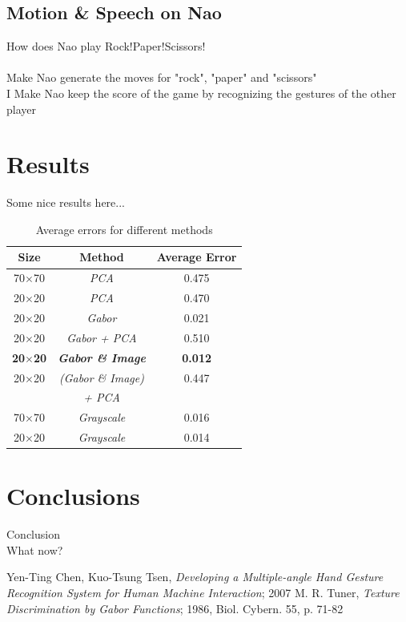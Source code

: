 \documentclass[a4paper, 11pt, twocolumn]{article}
\begin{document}
        \subsection{Motion \& Speech on Nao}
		\label{sec:Meth_naoPlay}
        How does Nao play Rock!Paper!Scissors!\\\\
        Make Nao generate the moves for "rock", "paper" and "scissors"\\
        I Make Nao keep the score of the game by recognizing the gestures of the
        other player
    \section{Results}
	\label{sec:results}
    	Some nice results here...\\
		\begin{table}[!hbtp]
		\begin{tabular}{| c | c | c |}
			\hline\hline
			\textbf{Size} & \textbf{Method} & \textbf{Average Error}\\ 
			\hline\hline
			  70$\times$70 & \emph{PCA} & 0.475\\
			\hline
			  20$\times$20 & \emph{PCA} & 0.470\\
			\hline
			  20$\times$20 & \emph{Gabor} & 0.021\\
			\hline
			  20$\times$20 & \emph{Gabor + PCA} & 0.510\\
			\hline
			  \textbf{20$\times$20} & \textbf{\emph{Gabor \& Image}} & \textbf{0.012}\\
		 	\hline
			  20$\times$20 & \emph{(Gabor \& Image)} & 0.447\\
		               & \emph {+ PCA}  &     \\ 			
			\hline
			  70$\times$70 & \emph{Grayscale} & 0.016\\
			\hline
			  20$\times$20 & \emph{Grayscale} & 0.014\\
			\hline
		\end{tabular}
		\caption{Average errors for different methods}
		\end{table}

    \section{Conclusions}
	\label{sec:conclusion}
    	Conclusion\\
   	 	What now?
	\begin{thebibliography}{2}
		Yen-Ting Chen, Kuo-Tsung Tsen, \emph{Developing a Multiple-angle Hand Gesture Recognition System for Human Machine Interaction}; 2007
		M. R. Tuner, \emph{Texture Discrimination by Gabor Functions}; 1986, Biol. Cybern. 55, p. 71-82 
	\end{thebibliography}    
\end{document}
